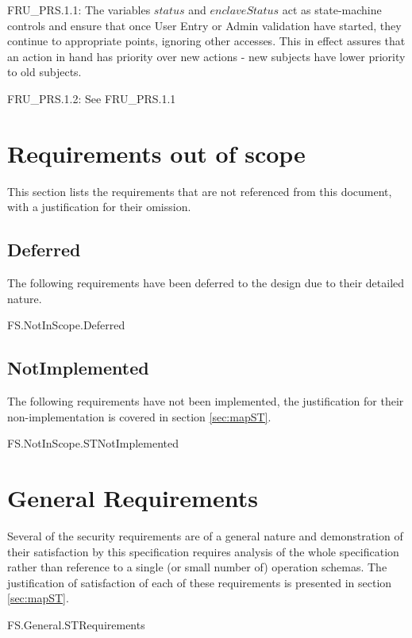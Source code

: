 {\footnotesize \sf 
FRU\_PRS.1.1:
}
\newline
	The variables $status$ and $enclaveStatus$ act as state-machine
	controls and ensure that once User Entry or Admin validation
	have started, they continue to appropriate points, ignoring
	other accesses. This in effect assures that an action in hand
	has priority over new actions - new subjects have lower
	priority to old subjects. 

{\footnotesize \sf 
FRU\_PRS.1.2:
}
\newline
	See FRU\_PRS.1.1




\section{Requirements out of scope}
This section lists the requirements that are not referenced from this
document, with a justification for their omission.

\subsection{Deferred}

The following requirements have been deferred to the design due to their
detailed nature.

\begin{traceunit}{FS.NotInScope.Deferred}

\end{traceunit}%

\subsection{NotImplemented}

The following requirements have not been implemented, the
justification for their non-implementation is covered in section \ref{sec:mapST}.

\begin{traceunit}{FS.NotInScope.STNotImplemented}
\end{traceunit}%

\section{General Requirements}
Several of the security requirements are of a general nature and demonstration
of their satisfaction by this specification requires analysis of the
whole specification rather than reference to a single (or small number
of) operation schemas. The justification of satisfaction of each of
these requirements is presented in section \ref{sec:mapST}.

\begin{traceunit}{FS.General.STRequirements}
\end{traceunit}%








